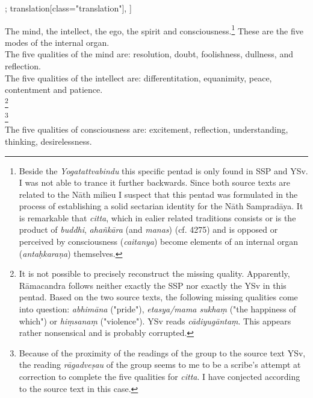 \begin{alignment}[
  texts=edition[class="edition"];
  translation[class="translation"],
  ]
\begin{translation}
\begin{tlate}[p50_02]
The mind, the intellect, the ego, the spirit and consciousness.\footnote{Beside the \textit{Yogatattvabindu} this specific pentad is only found in SSP and YSv. I was not able to trance it further backwards. Since both source texts are related to the Nāth milieu I suspect that this pentad was formulated in the process of establishing a solid sectarian identity for the Nāth Sampradāya. It is remarkable that \textit{citta}, which in ealier related traditions consists or is the product of \textit{buddhi}, \textit{ahañkāra} (and \textit{manas}) (cf.  4275) and is opposed or perceived by consciousness (\textit{caitanya}) become elements of an internal organ (\textit{antaḥkaraṇa}) themselves.} These are the five modes of the internal organ.\\
      
The five qualities of the mind are: resolution, doubt, foolishness, dullness, and reflection. \\

The five qualities of the intellect are: differentitation, equanimity, peace, contentment and patience.\\

\footnote{It is not possible to precisely reconstruct the missing quality. Apparently, Rāmacandra follows neither exactly the SSP nor exactly the YSv in this pentad. Based on the two source texts, the following missing qualities come into question: \textit{abhimāna} ("pride"), \textit{etasya/mama sukhaṃ} ("the happiness of which") or \textit{hiṃsanaṃ} ("violence"). YSv reads \textit{cādiyugāntaṃ}. This appears rather nonsensical and is probably corrupted.}\\

\footnote{Because of the proximity of the readings of the \alpha group to the source text YSv, the reading \textit{rāgadveṣau} of the \beta group seems to me to be a scribe's attempt at correction to complete the five qualities for \textit{citta}. I have conjected according to the source text in this case.}\\

The five qualities of consciousness are: excitement, reflection, understanding, thinking, desirelessness.\\
    \end{tlate}
  \end{translation}
\end{alignment}
